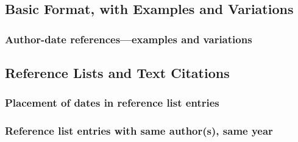 \documentclass[11pt,letterpaper,oneside]{article}
\begin{document}
\subsection{Basic Format, with Examples and Variations}
\setcounter{subsection}{15}

\setcounter{subsubsection}{8}
\subsubsection{Author-date references—examples and variations}

\begin{citeref}
\item \parencite[87--88]{strayed2012}
\item \parencite[32]{daum2015}
\item \parencite[188]{grazer2015}
\item \parencite[242--55]{garcia1988}
\item \parencite[310]{gould1984a}
\item \parencite[484--85]{bagley2015}
\item \parencite[312]{liu2015}
\end{citeref}

\setcounter{subsection}{1}
\subsection{Reference Lists and Text Citations}
\setcounter{subsection}{15}

\setcounter{subsubsection}{13}
\subsubsection{Placement of dates in reference list entries}

\begin{citeref}
\item \parencite{pager2015}
\item \parencite{unger2014}
\end{citeref}

\setcounter{subsubsection}{19}
\subsubsection{Reference list entries with same author(s), same year}
\end{document}
